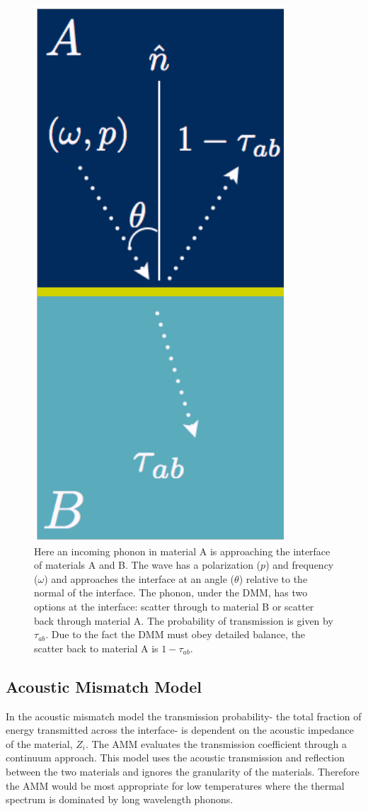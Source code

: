 \begin{figure}
    \centering
    \includegraphics[scale=0.75]{figures/interface-graphic.png}
    \caption{Here an incoming phonon in material A is approaching the interface of materials A and B. The wave has a polarization ($p$) and frequency ($\omega$) and approaches the interface at an angle ($\theta$) relative to the normal of the interface. The phonon, under the DMM, has two options at the interface: scatter through to material B or scatter back through material A. The probability of transmission is given by $\tau_{ab}$. Due to the fact the DMM must obey detailed balance, the scatter back to material A is $1 - \tau_{ab}$.}
    \label{fig:interface-graphic}
\end{figure}

\subsection{Acoustic Mismatch Model}
In the acoustic mismatch model the transmission probability- the total fraction of energy transmitted across the interface- is dependent on the acoustic impedance of the material, $Z_i$. The AMM evaluates the transmission coefficient through a continuum approach.\cite{Little1959} This model uses the acoustic transmission and reflection between the two materials and ignores the granularity of the materials. Therefore the AMM would be most appropriate for low temperatures where the thermal spectrum is dominated by long wavelength phonons.\cite{Graff1975} 

